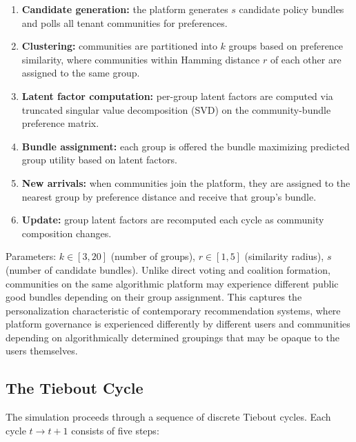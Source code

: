 \documentclass{article}
\begin{document}
\begin{enumerate}
    \item \textbf{Candidate generation:} the platform generates $s$ candidate policy bundles and polls all tenant communities for preferences.
    \item \textbf{Clustering:} communities are partitioned into $k$ groups based on preference similarity, where communities within Hamming distance $r$ of each other are assigned to the same group.
    \item \textbf{Latent factor computation:} per-group latent factors are computed via truncated singular value decomposition (SVD) on the community-bundle preference matrix.
    \item \textbf{Bundle assignment:} each group is offered the bundle maximizing predicted group utility based on latent factors.
    \item \textbf{New arrivals:} when communities join the platform, they are assigned to the nearest group by preference distance and receive that group's bundle.
    \item \textbf{Update:} group latent factors are recomputed each cycle as community composition changes.
\end{enumerate}

\noindent Parameters: $k \in [3,20]$ (number of groups), $r \in [1,5]$ (similarity radius), $s$ (number of candidate bundles). Unlike direct voting and coalition formation, communities on the same algorithmic platform may experience different public good bundles depending on their group assignment. This captures the personalization characteristic of contemporary recommendation systems, where platform governance is experienced differently by different users and communities depending on algorithmically determined groupings that may be opaque to the users themselves.

\subsection{The Tiebout Cycle}
\label{sec:cycle}

The simulation proceeds through a sequence of discrete Tiebout cycles. Each cycle $t \rightarrow t+1$ consists of five steps:
\end{document}
